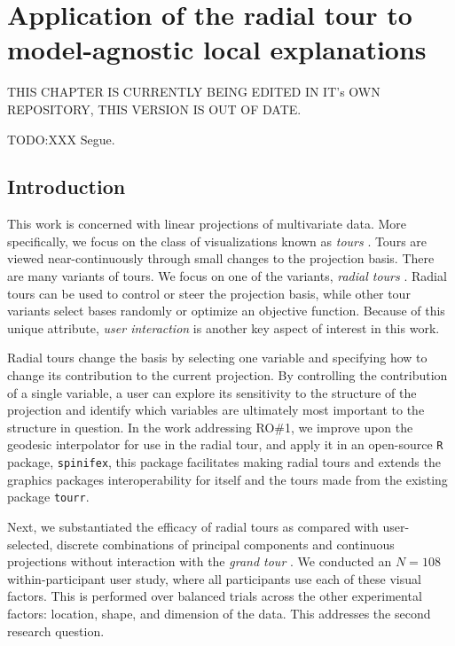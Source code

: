 \documentclass{template/monashthesis}
\begin{document}
\hypertarget{ch:cheem}{%
\chapter{Application of the radial tour to model-agnostic local explanations}\label{ch:cheem}}

THIS CHAPTER IS CURRENTLY BEING EDITED IN IT's OWN REPOSITORY, THIS VERSION IS OUT OF DATE.

TODO:XXX Segue.

\hypertarget{sec:intro}{%
\section{Introduction}\label{sec:intro}}

This work is concerned with linear projections of multivariate data. More specifically, we focus on the class of visualizations known as \emph{tours} \autocite{cook_grand_2008,lee_review_2021}. Tours are viewed near-continuously through small changes to the projection basis. There are many variants of tours. We focus on one of the variants, \emph{radial tours} \autocite{cook_manual_1997,spyrison_spinifex_2020}. Radial tours can be used to control or steer the projection basis, while other tour variants select bases randomly or optimize an objective function. Because of this unique attribute, \emph{user interaction} is another key aspect of interest in this work.

Radial tours change the basis by selecting one variable and specifying how to change its contribution to the current projection. By controlling the contribution of a single variable, a user can explore its sensitivity to the structure of the projection and identify which variables are ultimately most important to the structure in question. In the work addressing RO\#1, we improve upon the geodesic interpolator for use in the radial tour, and apply it in an open-source \texttt{R} package, \texttt{spinifex}, this package facilitates making radial tours and extends the graphics packages interoperability for itself and the tours made from the existing package \texttt{tourr}.

Next, we substantiated the efficacy of radial tours as compared with user-selected, discrete combinations of principal components \autocite{pearson_liii._1901} and continuous projections without interaction with the \emph{grand tour} \autocite{asimov_grand_1985}. We conducted an \(N=108\) within-participant user study, where all participants use each of these visual factors. This is performed over balanced trials across the other experimental factors: location, shape, and dimension of the data. This addresses the second research question.
\end{document}
